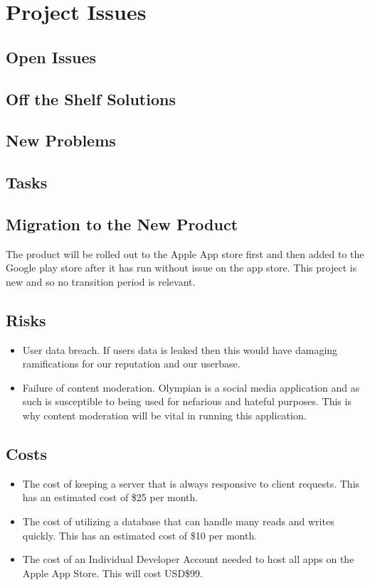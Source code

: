 \documentclass[12pt]{article}
\begin{document}
	\section{Project Issues}
	\subsection{Open Issues}
	\subsection{Off the Shelf Solutions}
	\subsection{New Problems}
	\subsection{Tasks}
	\subsection{Migration to the New Product}
    The product will be rolled out to the Apple App store first and then added to the Google play store after it has run without issue on the app store.
    This project is new and so no transition period is relevant.
  \subsection{Risks}
    \begin{itemize}
      \item User data breach. If users data is leaked then this would have damaging ramifications for our reputation and our userbase.
      \item Failure of content moderation. Olympian is a social media application and as such is susceptible to being used for nefarious and hateful purposes. This is why content moderation will be vital in running this application.
    \end{itemize}
  \subsection{Costs}
    \begin{itemize}
      \item The cost of keeping a server that is always responsive to client requests. This has an estimated cost of \$25 per month.
      \item The cost of utilizing a database that can handle many reads and writes quickly. This has an estimated cost of \$10 per month.
      \item The cost of an Individual Developer Account needed to host all apps on the Apple App Store. This will cost USD\$99.
    \end{itemize}
\end{document}

